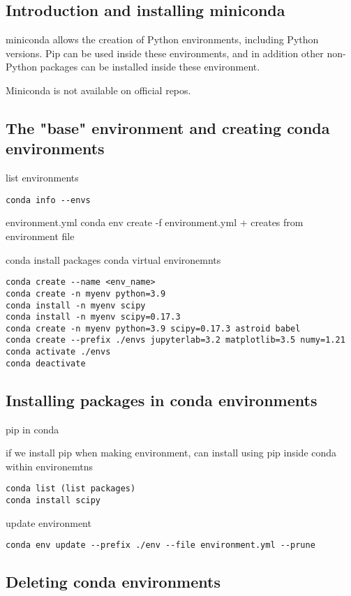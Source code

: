 
\subsection{Introduction and installing miniconda}

miniconda allows the creation of Python environments, including Python versions. Pip can be used inside these environments, and in addition other non-Python packages can be installed inside these environment.

Miniconda is not available on official repos.

\subsection{The "base" environment and creating conda environments}



list environments
\begin{verbatim}
conda info --envs
\end{verbatim}
environment.yml
conda env create -f environment.yml
+ creates from environment file

conda install packages
conda virtual environemnts

\begin{verbatim}
conda create --name <env_name>
conda create -n myenv python=3.9
conda install -n myenv scipy
conda install -n myenv scipy=0.17.3
conda create -n myenv python=3.9 scipy=0.17.3 astroid babel
conda create --prefix ./envs jupyterlab=3.2 matplotlib=3.5 numy=1.21
conda activate ./envs
conda deactivate
\end{verbatim}

\subsection{Installing packages in conda environments}
pip in conda

if we install pip when making environment, can install using pip inside conda
within environemtns
\begin{verbatim}
conda list (list packages)
conda install scipy
\end{verbatim}
update environment
\begin{verbatim}
conda env update --prefix ./env --file environment.yml --prune
\end{verbatim}

\subsection{Deleting conda environments}

